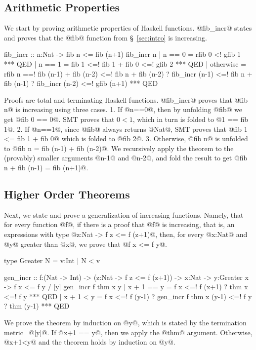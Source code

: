 \subsection{Arithmetic Properties}
%
We start by proving arithmetic properties
of Haskell functions.  @fib_incr@ states
and proves that the @fib@ function
from \S~\ref{sec:intro} is increasing.
%
\begin{code}
  fib_incr :: n:Nat -> {fib n <= fib (n+1)}
  fib_incr n
    | n == 0
    =   rfib 0
    <!  gfib 1
    *** QED
    | n == 1
    =   fib 1
    <=! fib 1 + fib 0
    <=! gfib 2
    *** QED
    | otherwise
    =   rfib n
    ==! fib (n-1) + fib (n-2)
    <=! fib n + fib (n-2) ? fib_incr (n-1)
    <=! fib n + fib (n-1) ? fib_incr (n-2)
    <=! gfib (n+1)
    *** QED
\end{code} %
Proofs are total and terminating Haskell functions.
@fib_incr@ proves that @fib n@ is increasing using three cases.
1. If @n==0@,
  then by unfolding @fib@ we get @fib 0 == 0@.
  SMT proves that $0 < 1$, which in turn is folded to @1 == fib 1@.
2. If @n==1@, since @fib@ always returns @Nat@, SMT proves that @fib 1 <= fib 1 + fib 0@
 which is folded to @fib 2@.
3. Otherwise,
  @fib n@ is unfolded to @fib n = fib (n-1) + fib (n-2)@.
  We recursively apply the theorem to the (provably) smaller arguments @n-1@ and @n-2@,
  and fold the result to get @fib n + fib (n-1) = fib (n+1)@.

\subsection{Higher Order Theorems}\label{subsec:higherorder}
Next, we state and prove a generalization of increasing functions.
Namely, that for every function @f@,
if there is a proof that @f@ is increasing, that is,
an expressions with type @z:Nat -> {f z <= f (z+1)}@,
then, for every @x:Nat@ and @y@ greater than @x@,
we prove that @f x <= f y@.
%
\begin{code}
  type Greater N = {v:Int | N < v}

  gen_incr :: f:(Nat -> Int)
           -> (z:Nat -> {f z <= f (z+1)})
           -> x:Nat
           -> y:Greater x
           -> {f x <= f y}
           / [y]
  gen_incr f thm x y
    | x + 1 == y
    =   f x
    <=! f (x+1) ? thm x
    <=! f y
    *** QED
    | x + 1 < y
    =   f x
    <=! f (y-1) ? gen_incr f thm x (y-1)
    <=! f y     ? thm (y-1)
    *** QED
\end{code}
%
We prove the theorem by induction on @y@,
which is stated by the termination metric~\citep{Vazou15} @[y]@.
%
If @x+1 == y@, then we apply the @thm@ argument.
Otherwise, @x+1<y@ and the theorem holds by induction on @y@.

